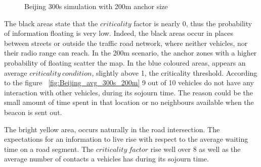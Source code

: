 \begin{figure}[h]

 	\caption{Beijing 300s simulation with 200m anchor size}
 	\label{fig:Beijing_300s_200m}
\end{figure}

The black areas state that the $criticality$ factor is nearly 0, thus the
probability of information floating is very low. Indeed, the black areas occur
in places between streets or outside the traffic road network, where neither
vehicles, nor their radio range can reach. In the 200m scenario, the anchor
zones with a higher probability of floating scatter the map. In the blue
coloured areas, appears an average $criticality\ condition$, slightly above
1, the criticality threshold. According to the figure
~\ref{fig:Beijing_avg_300s_200m} 9 out of 10 vehicles do not have any
interaction with other vehicles, during its sojourn time. The reason could be
the small amount of time spent in that location or no neighbours available when
the beacon is sent out.

The bright yellow area, occurs naturally in the road intersection. The
expectations for an information to live rise with respect to the average waiting
time on a road segment. The $criticality\ factor$ rise well over 8 as well as
the average number of contacts a vehicles has during its sojourn time.


